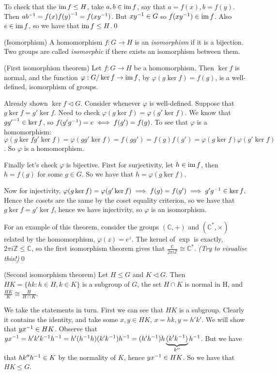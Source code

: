 \documentclass{article}
\newcommand{\nrm}{\triangleleft}
\begin{document}
To check that the $ \operatorname{im} f \le H $, take $ a,b\in \operatorname{im} f $, say that $ a=f(x), b=f(y) $. Then $ a{b}^{-1}=f(x){f(y)}^{-1}=f(x{y}^{-1}) $. But $ x{y}^{-1}\in G $ so $ f(x{y}^{-1})\in \operatorname{im} f $. Also $ e\in \operatorname{im} f $, so we have that $ \operatorname{im} f\le H $.\qed
\begin{definition}
	(Isomorphism) A homomorphism $ f:G\rightarrow H $ is an \textit{isomorphism} if it is a bijection. Two groups are called \textit{isomorphic} if there exists an isomorphism between them.
\end{definition}
\begin{theorem}
	(First isomorphism theorem) Let $ f:G\to H $ be a homomorphism. Then $ \ker f $ is normal, and the function $ \varphi:G/\ker f\rightarrow \operatorname{im} f $, by $ \varphi(g\ker f)=f(g) $, is a well-defined, isomorphism of groups.
\end{theorem}
\pf Already shown $ \ker f\nrm G $. Consider whenever $ \varphi $ is well-defined. Suppose that $ g\ker f=g'\ker f. $ Need to check $ \varphi(g\ker f)=\varphi(g'\ker f). $ We know that $ g{g'}^{-1}\in \ker f $, so $ f(g'{g}^{-1})=e\iff f(g')=f(g) $. To see that $ \varphi $ is a homomorphism: $ \varphi(g\ker f g'\ker f)=\varphi(gg'\ker f)=f(gg')=f(g)f(g')=\varphi(g\ker f)\varphi(g'\ker f) $. So $ \varphi $ is a homomorphism.

\par
Finally let's check $ \varphi $ is bijective. First for surjectivity, let $ h\in \operatorname{im} f $, then $ h=f(g) $ for some $ g\in G $. So we have that $ h=\varphi(g\ker f) $.

Now for injectivity, $ \varphi(g\ker f)=\varphi(g'\ker f)\implies f(g)=f(g') \implies g'{g}^{-1}\in\ker f $. Hence the cosets are the same by the coset equality criterion, so we have that $ g\ker f=g'\ker f $, hence we have injectivity, so $ \varphi $ is an isomorphism.

\par
For an example of this theorem, consider the groups $ (\mathbb C, +) $ and $ (\mathbb C^*, \times) $ related by the homomorphism, $ \varphi(z)= e^z$. The kernel of $ \exp $ is exactly, $ 2\pi i \mathbb Z\le \mathbb C $, so the first isomorphism theorem gives that $ \frac{\mathbb C}{2\pi i \mathbb Z}\cong \mathbb C^* $. \textit{(Try to visualise this!)}\qed 
\begin{theorem}
	(Second isomorphism theorem) Let $ H\le G $ and $ K\nrm G $. Then $ HK=\{hk : h\in H, k\in K\} $ is a subgroup of $ G $, the set $ H\cap K$ is normal in H, and $ \frac{HK}K\cong \frac H{H\cap K} $.
\end{theorem}
\pf We take the statements in turn. First we can see that $ HK $ is a subgroup. Clearly it contains the identity, and take some $ x,y\in HK $, $ x=hk, y=h'k' $. We will show that $ y{x}^{-1}\in HK $. Observe that $ y{x}^{-1} = h'k'{k}^{-1} {h}^{-1} = h'({h}^{-1} h)(k' {k}^{-1}){h}^{-1} = (h'{h}^{-1})h\underbrace{(k'{k}^{-1})}_{k''}{h}^{-1} $. But we have that $ hk''{h}^{-1} \in K $ by the normality of $ K $, hence $ y{x}^{-1} \in HK $. So we have that $ HK\le G $.
\end{document}
